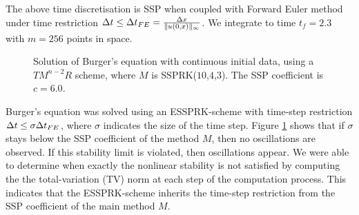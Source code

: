 The above time discretisation is SSP when coupled with Forward Euler method under time restriction $\Delta t \leq {\Delta t}_{FE} = \frac{\Delta x}{\|u(0,x)\|_{\infty}}$. We integrate to time $t_{f} = 2.3$ with $m = 256$ points in space.
\newline

\begin{figure}[t!]
    \centering
    \caption{Solution of Burger's equation with continuous initial data, using a $ TM^{n-2}R $ scheme, where $ M $ is SSPRK($ 10 $,$ 4 $,$ 3 $). The SSP coefficient is $ c = 6.0 $.}
    \label{fig5.3}
\end{figure}

Burger's equation was solved using an ESSPRK-scheme with time-step restriction $\Delta t \leq \sigma{\Delta t}_{FE}$, where $\sigma$ indicates the size of the time step. Figure \ref{fig5.3} shows that if $\sigma$ stays below the SSP coefficient of the method $M$, then no oscillations are observed. If this stability limit is violated, then oscillations appear.  We were able to determine when exactly the nonlinear stability is not satisfied by computing the the total-variation (TV) norm at each step of the computation process. This indicates that the ESSPRK-scheme inherits the time-step restriction from the SSP coefficient of the main method $M$.
\newline

